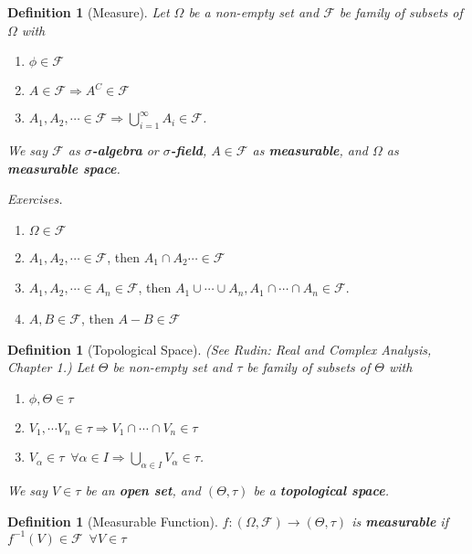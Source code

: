 \documentclass[12pt]{report}
\renewcommand{\1}{\mathbb{1}}
\theoremstyle{break}
\theoremstyle{newdef}
\newtheorem{defn}[thm]{Definition} %
\theoremstyle{remark}
\begin{document}
\begin{defn}[Measure]
Let $\Omega$ be a non-empty set and $\mathcal{F}$ be family of subsets of $\Omega$ with
\begin{enumerate}
\item $\phi \in \mathcal{F}$
\item $A \in \mathcal{F} \Rightarrow A^C \in \mathcal{F}$
\item $A_1, A_2, \cdots \in \mathcal{F} \Rightarrow \bigcup_{i=1}^\infty A_i \in \mathcal{F}$.
\end{enumerate}
We say $\mathcal{F}$ as \textbf{$\sigma$-algebra} or \textbf{$\sigma$-field}, $A \in \mathcal{F}$ as \textbf{measurable}, and $\Omega$ as \textbf{measurable space}.
\end{defn}


\textit{Exercises.}
\leavevmode
\begin{enumerate}[label = \arabic*)]
\item $\Omega \in \mathcal{F}$
\item $A_1, A_2, \cdots \in \mathcal{F}$, then $A_1\cap A_2 \cdots \in \mathcal{F}$
\item $A_1, A_2, \cdots \in A_n \in \mathcal{F}$, then $A_1 \cup \cdots \cup A_n, A_1 \cap \cdots \cap A_n \in \mathcal{F}$.
\item $A, B \in \mathcal{F}$, then $A-B \in \mathcal{F}$
\end{enumerate}


\begin{defn}[Topological Space]
(See Rudin: \textit{Real and Complex Analysis, Chapter 1.})
Let $\Theta$ be non-empty set and $\tau$ be family of subsets of $\Theta$ with
\begin{enumerate}
\item $\phi, \Theta \in \tau$
\item $V_1, \cdots V_n \in \tau \Rightarrow V_1 \cap \cdots \cap V_n \in \tau$
\item $V_\alpha \in \tau \enspace \forall \alpha \in I \Rightarrow \bigcup_{\alpha\in I}V_\alpha \in \tau$.
\end{enumerate}
We say $V\in\tau$ be an \textbf{open set}, and $(\Theta,\tau)$ be a \textbf{topological space}.
\end{defn}


\begin{defn}[Measurable Function]
$f : (\Omega, \mathcal{F}) \rightarrow (\Theta, \tau)$ is \textbf{measurable} if
$f^{-1}(V) \in \mathcal{F} \enspace \forall V \in \tau$
\end{defn}
\end{document}
